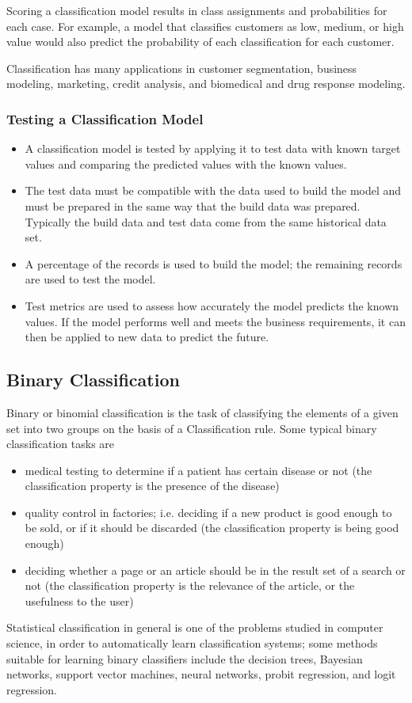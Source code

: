 Scoring a classification model results in class assignments and probabilities for each case. For example, a model that classifies customers as low, medium, or high value would also predict the probability of each classification for each customer.

Classification has many applications in customer segmentation, business modeling, marketing, credit analysis, and biomedical and drug response modeling.

\subsubsection{Testing a Classification Model}
\begin{itemize}
\item A classification model is tested by applying it to test data with known target values and comparing the predicted values with the known values.
\item The test data must be compatible with the data used to build the model and must be prepared in the same way that the build data was prepared. Typically the build data and test data come from the same historical data set. \item A percentage of the records is used to build the model; the remaining records are used to test the model.
\item Test metrics are used to assess how accurately the model predicts the known values. If the model performs well and meets the business requirements, it can then be applied to new data to predict the future.
\end{itemize}

\subsection{Binary Classification}

Binary or binomial classification is the task of classifying the elements of a given set into two groups on the basis of a Classification rule. Some typical binary classification tasks are

\begin{itemize}
\item medical testing to determine if a patient has certain disease or not (the classification property is the presence of the disease)
\item quality control in factories; i.e. deciding if a new product is good enough to be sold, or if it should be discarded (the classification property is being good enough)
\item deciding whether a page or an article should be in the result set of a search or not (the classification property is the relevance of the article, or the usefulness to the user)
\end{itemize}
Statistical classification in general is one of the problems studied in computer science, in order to automatically learn classification systems; some methods suitable for learning binary classifiers include the decision trees, Bayesian networks, support vector machines, neural networks, probit regression, and logit regression.

